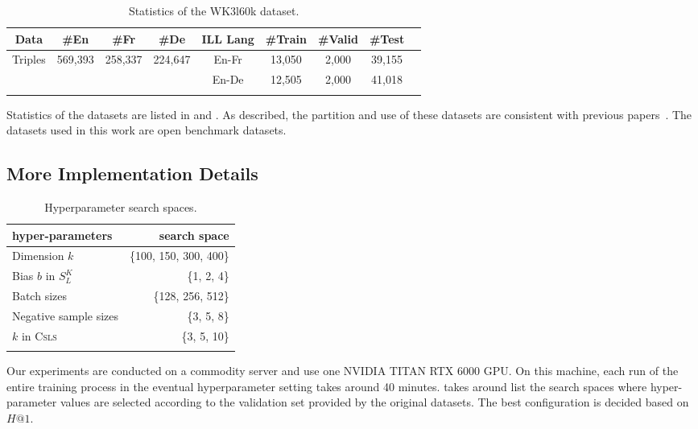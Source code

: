 \documentclass[11pt,a4paper]{article}
\makeatletter
\def\bhline{\specialrule{.2em}{0em}{0em}}
\def\hitsone{\mathit{H}\mbox{@}1}
\makeatother
\begin{document}
{
\begin{table}[h!]
\setlength\tabcolsep{2pt}
\centering
\scriptsize
\begin{tabular}{c|ccc|c|cccc}
\bhline
Data&\#En&\#Fr&\#De&ILL Lang&\#Train&\#Valid&\#Test\\
\hline
\multirow{2}{*}{Triples}&\multirow{2}{*}{569,393}&\multirow{2}{*}{258,337}&\multirow{2}{*}{224,647}&En-Fr&13,050&2,000&39,155\\
&&&&En-De&12,505&2,000&41,018\\
\bhline
\end{tabular}
\caption{Statistics of the WK3l60k dataset.}\label{tbl:statwk}
\end{table}
}


Statistics of the datasets are listed in  and .
As described, the partition and use of these datasets are consistent with previous papers~\cite{chen2018co,sun2017cross,sun2018bootstrapping,wang2018cross,yang2019aligning,pei2019transport}. The datasets used in this work are open benchmark datasets. 






\subsection{More Implementation Details}\label{sup:hyper}

\begin{table}[h] \small
\setlength{\tabcolsep}{1pt}
\caption{Hyperparameter search spaces.}
\label{tbl:search_space}
\centering
\begin{tabular}{lr}
\bhline
hyper-parameters & search space \\
\hline
Dimension $k$ & \{100, 150, 300, 400\}\\
Bias $b$ in $S^K_L$ & \{1, 2, 4\} \\
Batch sizes & \{128, 256, 512\} \\
Negative sample sizes & \{3, 5, 8\} \\
$k$ in \textsc{Csls} & \{3, 5, 10\}\\
\bhline
\end{tabular}
\end{table}

Our experiments are conducted on a commodity server and use one NVIDIA TITAN RTX 6000 GPU.
On this machine,
each run of the entire training process in the eventual hyperparameter setting takes around 40 minutes.
 takes around list the search spaces where hyper-parameter values are selected according to the validation set provided by the original datasets.
The best configuration is decided based on $\hitsone$.



 
\end{document}

